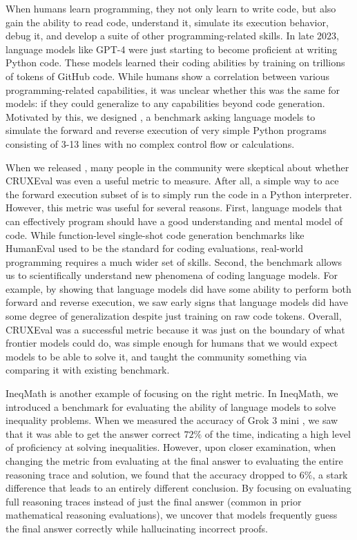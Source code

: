 When humans learn programming, they not only learn to write code, but also gain the ability to read code, understand it,
simulate its execution behavior, debug it, and develop a suite of other programming-related skills. 
In late 2023, language models like GPT-4 were just starting to become proficient at writing Python code.
These models learned their coding abilities by training on trillions of tokens of GitHub code. 
While humans show a correlation between various programming-related capabilities, it was unclear whether this was the same for models: if they could generalize 
to any capabilities beyond code generation.
Motivated by this, we designed \benchmark{} \citep{gu2024cruxeval}, a benchmark asking language models to simulate the forward and reverse execution of very simple
Python programs consisting of 3-13 lines with no complex control flow or calculations.

When we released \benchmark, many people in the community were skeptical about whether CRUXEval was even a useful metric to measure.
After all, a simple way to ace the forward execution subset of \benchmark{} is to simply run the code in a Python interpreter.
However, this metric was useful for several reasons. First, language models that can effectively 
program should have a good understanding and mental model of code. While function-level single-shot code generation benchmarks
like HumanEval used to be the standard for coding evaluations, real-world programming requires a much wider set of skills. Second, the benchmark allows us to scientifically understand new phenomena of coding language models.
For example, by showing that language models did have some ability to perform both forward and reverse execution, we saw early signs that
language models did have some degree of generalization despite just training on raw code tokens. 
Overall, CRUXEval was a successful metric because it was just on the boundary of what frontier models could do, 
was simple enough for humans that we would expect models to be able to solve it,
and taught the community something via comparing it with existing benchmark.

IneqMath \citep{sheng2026solving} is another example of focusing on the right metric. In IneqMath, we introduced a benchmark for evaluating 
the ability of language models to solve inequality problems. 
When we measured the accuracy of Grok 3 mini \citep{xai2025grok3mini}, we saw that it was able to get 
the answer correct $72\%$ of the time, indicating a high level of proficiency at solving inequalities.
However, upon closer examination, when changing the metric from evaluating at the final answer to 
evaluating the entire reasoning trace and solution, we found that the
accuracy dropped to $6\%$, a stark difference that leads to an entirely different conclusion. 
By focusing on evaluating full reasoning traces instead of just the final answer (common in prior mathematical reasoning evaluations),
we uncover that models frequently guess the final answer correctly while hallucinating incorrect proofs.

